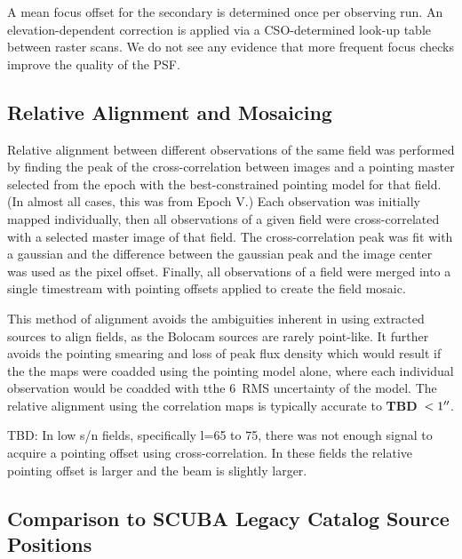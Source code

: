 \documentclass[12pt,preprint]{aastex}
\newcommand{\TBD}{{\bf TBD}}
\begin{document}
A mean focus offset for the secondary is determined once per observing
run.  An elevation-dependent correction is applied via a
CSO-determined look-up table between raster scans.  We do not see any
evidence that more frequent focus checks improve the quality of the
PSF.

\subsection{Relative Alignment and Mosaicing}

Relative alignment between different observations of the same field
was performed by finding the peak of the cross-correlation between
images and a pointing master selected from the epoch with the
best-constrained pointing model for that field. (In almost all cases,
this was from Epoch V.)  Each observation was initially mapped
individually, then all observations of a given field were
cross-correlated with a selected master image of that field. The
cross-correlation peak was fit with a gaussian and the difference
between the gaussian peak and the image center was used as the pixel
offset. 
Finally, all observations of a field were merged into a single
timestream with pointing offsets applied to create the field mosaic.

This method of alignment avoids the ambiguities inherent in using
extracted sources to align fields, as the Bolocam sources are rarely
point-like.  It further avoids the pointing smearing and loss of peak
flux density which would result if the the maps were coadded using the
pointing model alone, where each individual observation would be
coadded with tthe 6\arcsec\ RMS uncertainty of the model.  The
relative alignment using the correlation maps is typically accurate to
\TBD\ $<1\mbox{$^{\prime\prime}$}$.

TBD: In low s/n fields, specifically l=65 to 75, there was not enough signal to
acquire a pointing offset using cross-correlation.  In these fields the
relative pointing offset is larger and the beam is slightly larger.

\subsection{Comparison to SCUBA Legacy Catalog Source Positions}
\label{sec:SCUBAPointingComparison}
\end{document}
